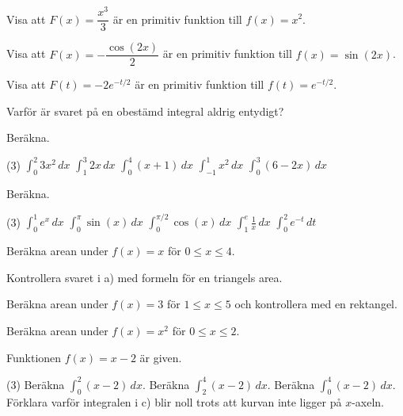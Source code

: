 \begin{parts}
  \item Visa att $F(x) = \dfrac{x^3}{3}$ är en primitiv funktion till $f(x) = x^2$.
  \item Visa att $F(x) = -\dfrac{\cos(2x)}{2}$ är en primitiv funktion till $f(x) = \sin(2x)$.
  \item Visa att $F(t) = -2e^{-t/2}$ är en primitiv funktion till $f(t) = e^{-t/2}$.
  \item Varför är svaret på en obestämd integral aldrig entydigt?
\end{parts}

Beräkna.
\begin{delar}(3)
  \task $\displaystyle\int_0^2 3x^2\,dx$
  \task $\displaystyle\int_1^3 2x\,dx$
  \task $\displaystyle\int_0^4 (x + 1)\,dx$
  \task $\displaystyle\int_{-1}^{1} x^2\,dx$
  \task $\displaystyle\int_0^3 (6 - 2x)\,dx$
\end{delar}

Beräkna.
\begin{delar}(3)
  \task $\displaystyle\int_0^1 e^x\,dx$
  \task $\displaystyle\int_0^{\pi} \sin(x)\,dx$
  \task $\displaystyle\int_0^{\pi/2} \cos(x)\,dx$
  \task $\displaystyle\int_1^{e} \frac{1}{x}\,dx$
  \task $\displaystyle\int_0^2 e^{-t}\,dt$
\end{delar}

\begin{parts}
  \item Beräkna arean under $f(x) = x$ för $0 \leq x \leq 4$.
  \item Kontrollera svaret i a) med formeln för en triangels area.
  \item Beräkna arean under $f(x) = 3$ för $1 \leq x \leq 5$ och kontrollera med en rektangel.
  \item Beräkna arean under $f(x) = x^2$ för $0 \leq x \leq 2$.
\end{parts}

Funktionen $f(x) = x - 2$ är given.
\begin{delar}(3)
  \task Beräkna $\displaystyle\int_0^2 (x - 2)\,dx$.
  \task Beräkna $\displaystyle\int_2^4 (x - 2)\,dx$.
  \task Beräkna $\displaystyle\int_0^4 (x - 2)\,dx$.
  \task* Förklara varför integralen i c) blir noll trots att kurvan inte ligger på $x$-axeln.
\end{delar}

